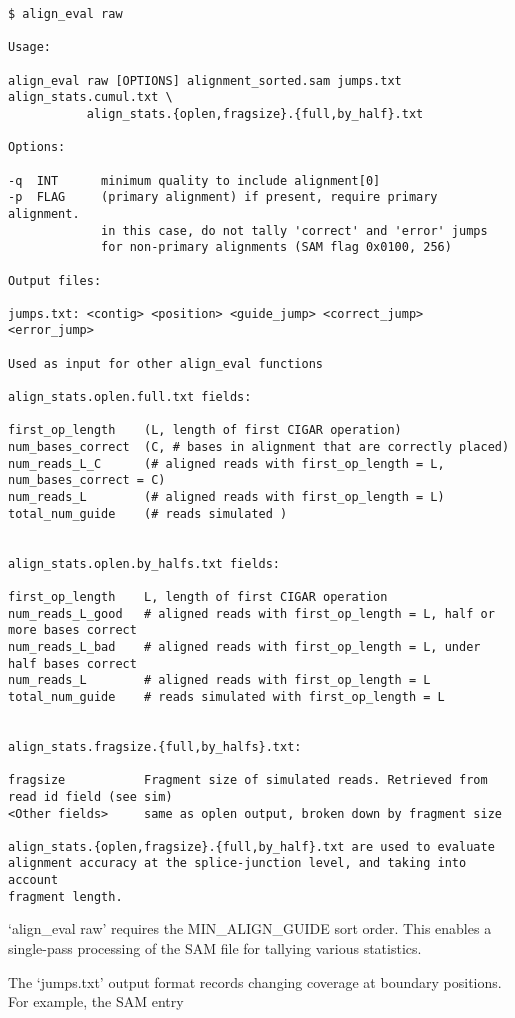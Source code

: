 \documentclass[10pt]{article}
\begin{document}
{\small
\begin{verbatim}
$ align_eval raw

Usage:

align_eval raw [OPTIONS] alignment_sorted.sam jumps.txt align_stats.cumul.txt \
           align_stats.{oplen,fragsize}.{full,by_half}.txt

Options:

-q  INT      minimum quality to include alignment[0]
-p  FLAG     (primary alignment) if present, require primary alignment.
             in this case, do not tally 'correct' and 'error' jumps
             for non-primary alignments (SAM flag 0x0100, 256)

Output files:

jumps.txt: <contig> <position> <guide_jump> <correct_jump> <error_jump>

Used as input for other align_eval functions

align_stats.oplen.full.txt fields:

first_op_length    (L, length of first CIGAR operation)
num_bases_correct  (C, # bases in alignment that are correctly placed)
num_reads_L_C      (# aligned reads with first_op_length = L, num_bases_correct = C)
num_reads_L        (# aligned reads with first_op_length = L)
total_num_guide    (# reads simulated )


align_stats.oplen.by_halfs.txt fields:

first_op_length    L, length of first CIGAR operation
num_reads_L_good   # aligned reads with first_op_length = L, half or more bases correct
num_reads_L_bad    # aligned reads with first_op_length = L, under half bases correct
num_reads_L        # aligned reads with first_op_length = L
total_num_guide    # reads simulated with first_op_length = L


align_stats.fragsize.{full,by_halfs}.txt:

fragsize           Fragment size of simulated reads. Retrieved from read id field (see sim)
<Other fields>     same as oplen output, broken down by fragment size

align_stats.{oplen,fragsize}.{full,by_half}.txt are used to evaluate
alignment accuracy at the splice-junction level, and taking into account
fragment length.
\end{verbatim}
}

`align\_eval raw' requires the MIN\_ALIGN\_GUIDE sort order. This enables
a single-pass processing of the SAM file for tallying various
statistics.

The `jumps.txt' output format records changing coverage at boundary
positions. For example, the SAM entry
\end{document}
